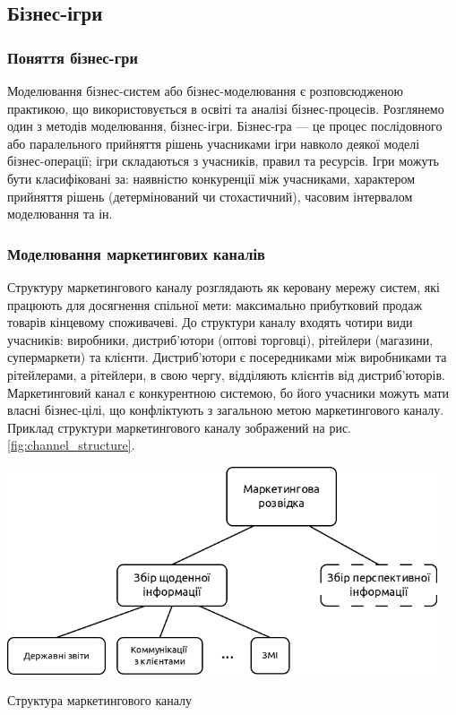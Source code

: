     \subsection{Бізнес-ігри}
        \subsubsection{Поняття бізнес-гри}
Моделювання бізнес-систем або бізнес-моделювання є розповсюдженою практикою, що використовується в освіті та аналізі бізнес-процесів. Розглянемо один з методів моделювання, бізнес-ігри. Бізнес-гра --- це процес послідовного або паралельного прийняття рішень учасниками ігри навколо деякої моделі бізнес-операції\cite{bg1}; ігри складаються з учасників, правил та ресурсів\cite{bg2}. Ігри можуть бути класифіковані за\cite{bg3}: наявністю конкуренції між учасниками, характером прийняття рішень (детермінований чи стохастичний), часовим інтервалом моделювання та ін.
        
        \subsubsection{Моделювання маркетингових каналів}
Структуру маркетингового каналу розглядають як керовану мережу систем, які працюють для досягнення спільної мети\cite{stern}: 
максимально прибутковий продаж товарів кінцевому споживачеві. До структури каналу входять чотири види учасників: виробники, дистриб’ютори (оптові торговці), рітейлери (магазини, супермаркети) та клієнти. Дистриб’ютори є посередниками між виробниками та рітейлерами, а рітейлери, в свою чергу, відділяють клієнтів від дистриб’юторів. Маркетинговий канал є конкурентною системою, бо його учасники можуть мати власні бізнес-цілі, що конфліктують з загальною метою маркетингового каналу. Приклад структури маркетингового каналу зображений на рис. \ref{fig:channel_structure}.

            \begin{stdfigure}
                \includegraphics[width=5in]{images/channel_structure.png}
                \caption{Структура маркетингового каналу}
                \label{fig:channel_structure}
            \end{stdfigure}    

